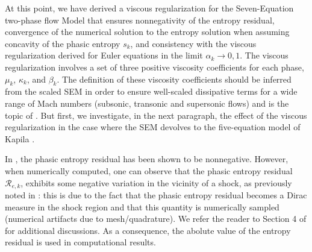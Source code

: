 %
At this point, we have derived a viscous regularization for the Seven-Equation two-phase flow Model that ensures nonnegativity of the 
entropy residual, convergence of the numerical solution to the entropy solution when assuming concavity of the phasic entropy $s_k$, and consistency with 
the viscous regularization derived for Euler equations \cite{jlg_VR_SIAM_2004,Marco_paper_low_mach} in the limit $\alpha_k \to 0,1$. The viscous 
regularization involves a set of three positive viscosity coefficients for each phase, $\mu_k$, $\kappa_k$, and $\beta_k$. The definition 
of these viscosity coefficients should be inferred from the scaled SEM in order to ensure well-scaled dissipative terms for a wide range 
of Mach numbers (subsonic, transonic and supersonic flows) and is the topic of . But first, we investigate, in the 
next paragraph, the effect of the viscous regularization in the case where the SEM devolves to the five-equation model of 
Kapila \cite{Kapila_2001}.
%
\begin{my_remark}\label{rmq:ent_res_neg}
In , the phasic entropy residual has been shown to be nonnegative. However, when numerically computed, one can observe that the phasic entropy residual $\mathcal{R}_{e,k}$,
exhibits some negative variation in the vicinity of a shock, as previously noted  in \cite{Guermond_Pasquetti}: this is due to the fact that the phasic entropy residual becomes a Dirac measure in the shock region and that this quantity is numerically sampled (numerical
artifacts due to mesh/quadrature). We refer the reader to Section 4 of \cite{Guermond_Pasquetti} for additional discussions. As a consequence, the abolute value of the entropy residual is used in computational results.
\end{my_remark}
%
